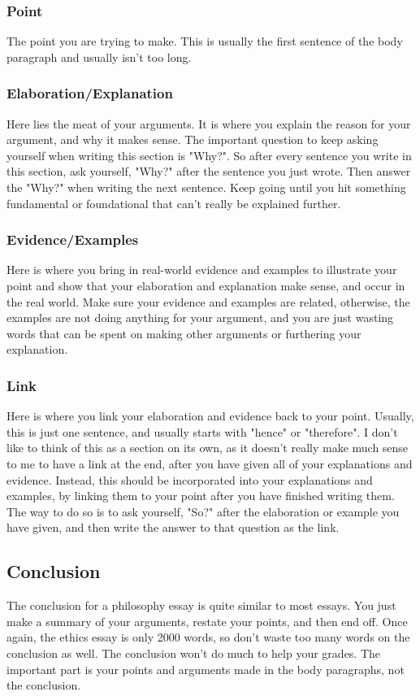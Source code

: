 \documentclass[11pt]{article}
\begin{document}
\subsubsection{Point}
\label{sec:org14ac340}
The point you are trying to make. This is usually the first sentence of the body paragraph and usually isn't too long.
\subsubsection{Elaboration/Explanation}
\label{sec:org4abfd81}
Here lies the meat of your arguments. It is where you explain the reason for your argument, and why it makes sense. The important question to keep asking yourself when writing this section is "Why?". So after every sentence you write in this section, ask yourself, "Why?" after the sentence you just wrote. Then answer the "Why?" when writing the next sentence. Keep going until you hit something fundamental or foundational that can't really be explained further.
\subsubsection{Evidence/Examples}
\label{sec:org42d7d3a}
Here is where you bring in real-world evidence and examples to illustrate your point and show that your elaboration and explanation make sense, and occur in the real world. Make sure your evidence and examples are related, otherwise, the examples are not doing anything for your argument, and you are just wasting words that can be spent on making other arguments or furthering your explanation.
\subsubsection{Link}
\label{sec:org6e29907}
Here is where you link your elaboration and evidence back to your point. Usually, this is just one sentence, and usually starts with "hence" or "therefore". I don't like to think of this as a section on its own, as it doesn't really make much sense to me to have a link at the end, after you have given all of your explanations and evidence. Instead, this should be incorporated into your explanations and examples, by linking them to your point after you have finished writing them. The way to do so is to ask yourself, "So?" after the elaboration or example you have given, and then write the answer to that question as the link.

 \newpage
\subsection{Conclusion}
\label{sec:org4880822}
The conclusion for a philosophy essay is quite similar to most essays. You just make a summary of your arguments, restate your points, and then end off. Once again, the ethics essay is only 2000 words, so don't waste too many words on the conclusion as well. The conclusion won't do much to help your grades. The important part is your points and arguments made in the body paragraphs, not the conclusion.
\end{document}
